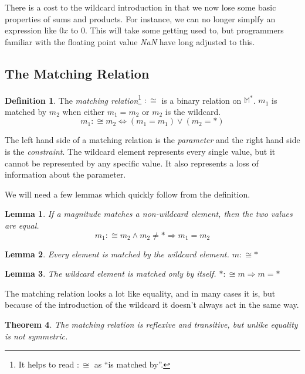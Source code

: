\documentclass[twoside]{article}
\newcommand{\quotes}[1]{``#1''}
\theoremstyle{plain}%
\newtheorem{theorem}{Theorem}[section]
\newtheorem{lemma}[theorem]{Lemma}
\theoremstyle{definition}
\newtheorem{definition}{Definition}[section]
\theoremstyle{remark}
\begin{document}
There is a cost to the wildcard introduction in that we now lose some basic properties of sums and products. For instance, we can no longer simplfy an expression like \(0x\) to \(0\). This will take some getting used to, but programmers familiar with the floating point value \textit{NaN} have long adjusted to this.

\subsection{The Matching Relation}

\begin{definition}
The \textit{matching relation}\footnote{It helps to read \(:\cong\) as \quotes{is matched by}.} \(:\cong\) is a binary relation on \(\mathbb{M}^*\). \(m_1\) is matched by \(m_2\) when either \(m_1 = m_2\) or  \(m_2\) is the wildcard.
\[m_1 :\cong m_2 \Longleftrightarrow (m_1 = m_1) \vee (m_2 = \ast)\]
\end{definition}

The left hand side of a matching relation is the \textit{parameter} and the right hand side is the \textit{constraint}. The wildcard element represents every single value, but it cannot be represented by any specific value. It also represents a loss of information about the parameter.

We will need a few lemmas which quickly follow from the definition.

\begin{lemma}
\label{wild_prop_1} If a magnitude matches a non-wildcard element, then the two values are equal. \[m_1 :\cong m_2 \wedge m_2 \neq \ast \Longrightarrow m_1 = m_2\]
\end{lemma}

\begin{lemma}
\label{wild_prop_2}
Every element is matched by the wildcard element. \(m :\cong \ast\)
\end{lemma}

\begin{lemma}
\label{wild_prop_3}
The wildcard element is matched only by itself. \(\ast :\cong m \Longrightarrow m = \ast\)
\end{lemma}

The matching relation looks a lot like equality, and in many cases it is, but because of the introduction of the wildcard it doesn't always act in the same way.

\begin{theorem}
The matching relation is reflexive and transitive, but unlike equality is not symmetric.
\end{theorem}
\end{document}
